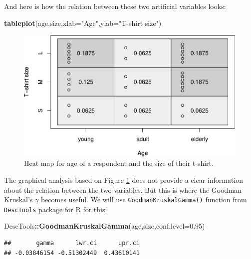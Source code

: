 \documentclass[
]{book}
\newenvironment{Shaded}{\begin{snugshade}}{\end{snugshade}}
\newcommand{\AttributeTok}[1]{\textcolor[rgb]{0.13,0.29,0.53}{#1}}
\newcommand{\FloatTok}[1]{\textcolor[rgb]{0.00,0.00,0.81}{#1}}
\newcommand{\FunctionTok}[1]{\textcolor[rgb]{0.13,0.29,0.53}{\textbf{#1}}}
\newcommand{\NormalTok}[1]{#1}
\newcommand{\SpecialCharTok}[1]{\textcolor[rgb]{0.81,0.36,0.00}{\textbf{#1}}}
\newcommand{\StringTok}[1]{\textcolor[rgb]{0.31,0.60,0.02}{#1}}
\theoremstyle{definition}
\theoremstyle{definition}
\theoremstyle{definition}
\theoremstyle{definition}
\theoremstyle{remark}
\begin{document}
And here is how the relation between these two artificial variables looks:

\begin{Shaded}
\begin{Highlighting}[]
\FunctionTok{tableplot}\NormalTok{(age,size,}\AttributeTok{xlab=}\StringTok{"Age"}\NormalTok{,}\AttributeTok{ylab=}\StringTok{"T{-}shirt size"}\NormalTok{)}
\end{Highlighting}
\end{Shaded}

\begin{figure}
\centering
\includegraphics{Svetunkov---Statistics-for-Business-Analytics_files/figure-latex/tableplotAgeSize-1.pdf}
\caption{\label{fig:tableplotAgeSize}Heat map for age of a respondent and the size of their t-shirt.}
\end{figure}

The graphical analysis based on Figure \ref{fig:tableplotAgeSize} does not provide a clear information about the relation between the two variables. But this is where the Goodman-Kruskal's \(\gamma\) becomes useful. We will use \texttt{GoodmanKruskalGamma()} function from \texttt{DescTools} package for R for this:

\begin{Shaded}
\begin{Highlighting}[]
\NormalTok{DescTools}\SpecialCharTok{::}\FunctionTok{GoodmanKruskalGamma}\NormalTok{(age,size,}\AttributeTok{conf.level=}\FloatTok{0.95}\NormalTok{)}
\end{Highlighting}
\end{Shaded}

\begin{verbatim}
##       gamma      lwr.ci      upr.ci 
## -0.03846154 -0.51302449  0.43610141
\end{verbatim}
\end{document}

